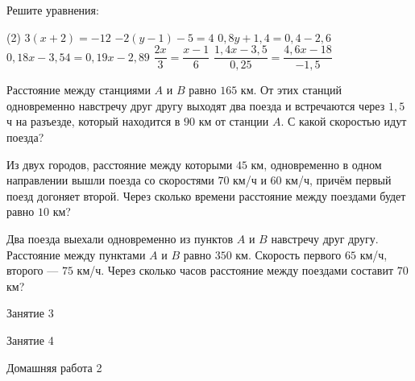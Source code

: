 \begin{homework}[number=1]
	\begin{listofex}
		\item Решите уравнения: %
		\begin{tasks}(2)
			\task \( 3(x+2)=-12 \)
			\task \( -2(y-1)-5=4 \)
			\task \( 0,8y+1,4=0,4-2,6 \)
			\task \( 0,18x-3,54=0,19x-2,89 \)
			\task \( \dfrac{ 2x }{ 3 }=\dfrac{ x-1 }{6  } \)
			\task \( \dfrac{ 1,4x-3,5 }{ 0,25 }=\dfrac{ 4,6x-18 }{ -1,5 } \)
		\end{tasks}
		\item Расстояние между станциями \(A\) и \(B\) равно \(165\) км. От этих станций одновременно навстречу друг другу выходят два поезда и встречаются через \(1,5\) ч на разъезде, который находится в \(90\) км от станции \(A\). С какой скоростью идут поезда?
		\item Из двух городов, расстояние между которыми \(45\) км, одновременно в одном направлении вышли поезда со скоростями \(70\) км/ч и \(60\) км/ч, причём первый поезд догоняет второй. Через сколько времени расстояние между поездами будет равно \(10\) км?
		\item Два поезда выехали одновременно из пунктов \(A\) и \(B\) навстречу друг другу. Расстояние между пунктами \(A\) и \(B\) равно \(350\) км. Скорость первого \(65\) км/ч, второго --- \(75\) км/ч. Через сколько часов расстояние между поездами составит \(70\) км?
	\end{listofex}
\end{homework}

\begin{class}[number=3]
	\begin{listofex}
		\item Занятие 3 
	\end{listofex}
\end{class}

\begin{class}[number=4]
	\begin{listofex}
		\item Занятие 4
	\end{listofex}
\end{class}

\begin{homework}[number=2]
	\begin{listofex}
		\item Домашняя работа 2
	\end{listofex}
\end{homework}

